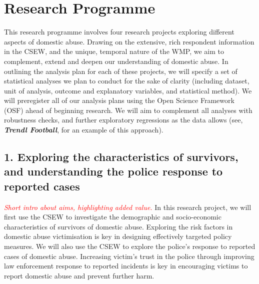 \documentclass[11pt, a4paper]{article}
\begin{document}
\newpage

\section*{Research Programme}

This research programme involves four research projects exploring different aspects of domestic abuse. Drawing on the extensive, rich respondent information in the CSEW, and the unique, temporal nature of the WMP, we aim to complement, extend and deepen our understanding of domestic abuse. In outlining the analysis plan for each of these projects, we will specify a set of statistical analyses we plan to conduct for the sake of clarity (including dataset, unit of analysis, outcome and explanatory variables, and statistical method). We will preregister all of our analysis plans using the Open Science Framework (OSF) ahead of beginning research. We will aim to complement all analyses with robustness checks, and further exploratory regressions as the data allows (see, \textbf{\textit{Trendl Football}}, for an example of this approach).

\subsection*{1. Exploring the characteristics of survivors, and understanding the police response to reported cases}

 \textcolor{red}{\textit{Short intro about aims, highlighting added value.}}
In this research project, we will first use the CSEW to investigate the demographic and socio-economic characteristics of survivors of domestic abuse. Exploring the risk factors in domestic abuse victimisation is key in designing effectively targeted policy measures. We will also use the CSEW to explore the police's response to reported cases of domestic abuse. Increasing victim's trust in the police through improving law enforcement response to reported incidents is key in encouraging victims to report domestic abuse and prevent further harm.

\end{document}
